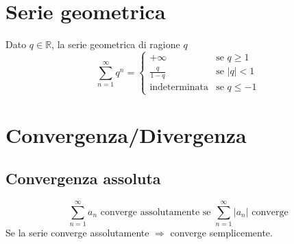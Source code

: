 \documentclass[12pt, a4paper]{article}
\begin{document}
\section{Serie geometrica}
    Dato $q\in\mathbb{R}$, la serie geometrica di ragione $q$ 
    \begin{equation*}
        \sum_{n=1}^{\infty}q^n = \begin{cases}
            +\infty & \text{se } q\geq 1\\
            \frac{q}{1-q} & \text{se } |q|< 1\\
            \text{indeterminata} & \text{se }q\leq -1
        \end{cases}
    \end{equation*}
\section{Convergenza/Divergenza}
    \subsection{Convergenza assoluta}
        \begin{equation*}
            \sum_{n=1}^{\infty}a_n \text{ converge assolutamente se } \sum_{n=1}^{\infty}\left|a_n\right| \text{ converge}
        \end{equation*}
        Se la serie converge assolutamente $\Rightarrow$ converge semplicemente.
\end{document}
